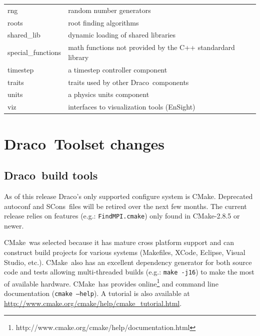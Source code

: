\documentclass[note]{ResearchNote_pdf}
\newcommand{\draco}{Draco}
\newcommand{\cmake}{\textsf{CMake}}
\newcommand{\scons}{\textsf{SCons}}
\newcommand{\tableText}[1]{{\raggedright #1}}
\begin{document}
\begin{center}
\begin{tabular}{lp{4.0in}}
    \textsf{rng}          & \tableText{random number generators} \\
    \textsf{roots}        & \tableText{root finding algorithms} \\
    \textsf{shared\_lib}  & \tableText{dynamic loading of shared libraries} \\
    \textsf{special\_functions} & \tableText{math functions not provided by the
      C++ standardard library} \\
    \textsf{timestep}     & \tableText{a timestep controller component} \\
    \textsf{traits}       & \tableText{traits used by other \draco\ components} \\
    \textsf{units}        & \tableText{a physics units component} \\
    \textsf{viz}          & \tableText{interfaces to visualization tools (EnSight)} \\
    \hline\hline 
  \end{tabular}
\end{center}


\section{\draco\ Toolset changes}
\subsection{\draco\ build tools}

As of this release \draco's only supported configure system is
\cmake\cite{cmake}.  Deprecated autoconf and \scons\ files will be
retired over the next few months.  The current release relies on
features (e.g.: \texttt{FindMPI.cmake}) only found in \cmake-2.8.5 or
newer.

\cmake\ was selected because it has mature cross platform support and
can construct build projects for various systems (\textsf{Makefiles},
\textsf{XCode}, \textsf{Eclipse}, \textsf{Visual Studio}, etc.).
\cmake\ also has an excellent dependency generator for both source
code and tests allowing multi-threaded builds (e.g.: \texttt{make
  -j16}) to make the most of available hardware.  \cmake\ has provides
online\footnote{http://www.cmake.org/cmake/help/documentation.html}
and command line documentation (\texttt{cmake --help}). A tutorial is
also available at
\url{http://www.cmake.org/cmake/help/cmake_tutorial.html}.
\end{document}

